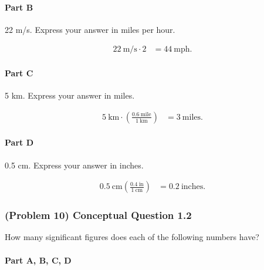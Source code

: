 \paragraph{Part B}

22 m/s. Express your answer in miles per hour.

\vspace{1em}

\begin{solution}
	\begin{align*}
		22~\text{m/s} \cdot 2 &= 44~\text{mph}
		.\end{align*}
\end{solution}

\paragraph{Part C}

5 km. Express your answer in miles.

\vspace{1em}

\begin{solution}
	\begin{align*}
		5~\text{km} \cdot \left( \frac{0.6~\text{mile}}{1~\text{km}} \right) &= 3~\text{miles}
		.\end{align*}
\end{solution}

\paragraph{Part D}

0.5 cm. Express your answer in inches.

\vspace{1em}

\begin{solution}
	\begin{align*}
		0.5~\text{cm} \left( \frac{0.4~\text{in}}{1~\text{cm}} \right) &= 0.2~\text{inches}
		.\end{align*}
\end{solution}

\subsubsection{(Problem 10) Conceptual Question 1.2}

How many significant figures does each of the following numbers have?

\paragraph{Part A, B, C, D}

